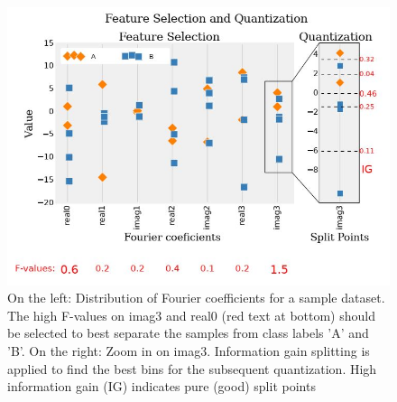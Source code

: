 \begin{figure}
    \captionsetup{justification=raggedright}
    \centering
    \includegraphics[scale = 0.5]{WEASEL_FEATURE.JPG}
    \centering
    \caption{On the left: Distribution of Fourier coefficients for a sample dataset. The high F-values on imag3 and real0 (red text at bottom) should be selected to best separate the samples from class labels ’A’ and ’B’. On the right: Zoom in on imag3. Information gain splitting is applied to find the best bins for the subsequent quantization. High information gain (IG) indicates pure (good) split points \cite{schafer2017fast}}
    \label{Img:WEASEL_FEATURE}
\end{figure}